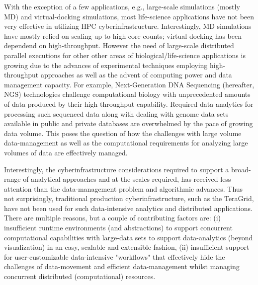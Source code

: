 \documentclass{sig-alternate}
\begin{document}


With the exception of a few applications, e.g., large-scale
simulations (mostly MD) and virtual-docking simulations, most
life-science applications have not been very effective in utilizing
HPC cyberinfrastructure.  Interestingly, MD simulations have mostly
relied on scaling-up to high core-counts; virtual docking has been
dependend on high-throughput.  However the need of large-scale
distributed parallel executions for other other areas of
biological/life-science applications is growing due to the advances of
experimental techniques employing high-throughput approaches as well
as the advent of computing power and data management capacity.  For
example, Next-Generation DNA Sequencing (hereafter, NGS) technologies
challenge computational biology with unprecedented amounts of data
produced by their high-throughput capability.  Required data analytics
for processing such sequenced data along with dealing with genome data
sets available in public and private databases are overwhelmed by the
pace of growing data volume.  This poses the question of how the
challenges with large volume data-management as well as the
computational requirements for analyzing large volumes of data are
effectively managed.


Interestingly, the cyberinfrastructure considerations required to
support a broad-range of analytical approaches and at the scales
required, has received less attention than the data-management problem
and algorithmic advances.  Thus not surprisingly, traditional
production cyberinfrastructure, such as the TeraGrid, have not been
used for such data-intensive analytics and distributed
applications. There are multiple reasons, but a couple of contributing
factors are: (i) insufficient runtime environments (and abstractions)
to support concurrent computational capabilities with large-data sets
to support data-analytics (beyond visualization) in an easy, scalable
and extensible fashion, (ii) insufficient support for
user-customizable data-intensive "workflows" that effectively hide the
challenges of data-movement and efficient data-management whilst
managing concurrent distributed (computational) resources.
\end{document}

